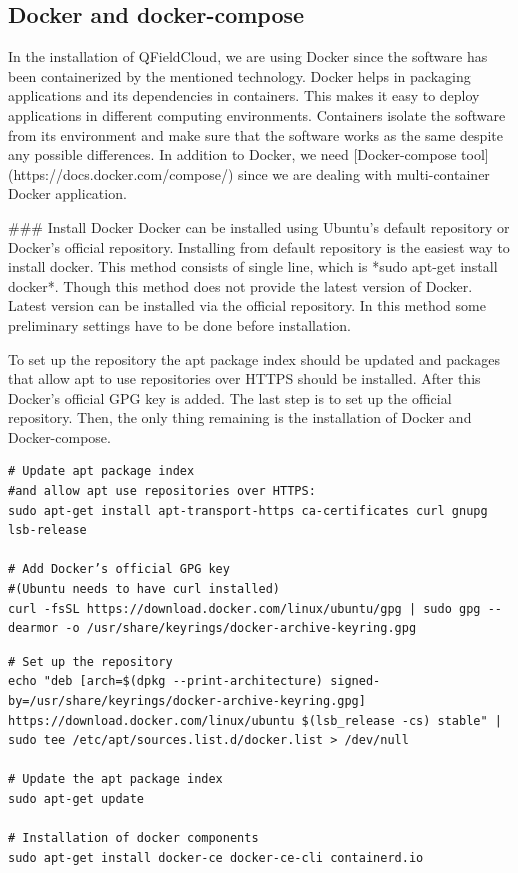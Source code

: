 \documentclass{article}
\begin{document}
\subsection{Docker and docker-compose}
\begin{markdown}
In the installation of QFieldCloud, we are using Docker since the software has been containerized by the mentioned technology. Docker helps in packaging applications and its dependencies in containers. This makes it easy to deploy applications in different computing environments. Containers isolate the software from its environment and make sure that the software works as the same despite any possible differences. In addition to Docker, we need [Docker-compose tool](https://docs.docker.com/compose/) since we are dealing with multi-container Docker application.

### Install Docker
Docker can be installed using Ubuntu’s default repository or Docker’s official repository. Installing from default repository is the easiest way to install docker. This method consists of single line, which is *sudo apt-get install docker*. Though this method does not provide the latest version of Docker. Latest version can be installed via the official repository. In this method some preliminary settings have to be done before installation. 

To set up the repository the apt package index should be updated and packages that allow apt to use repositories over HTTPS should be installed. After this Docker’s official GPG key is added. The last step is to set up the official repository. Then, the only thing remaining is the installation of Docker and Docker-compose.
\end{markdown}

\begin{verbatim}
# Update apt package index 
#and allow apt use repositories over HTTPS:
sudo apt-get install apt-transport-https ca-certificates curl gnupg lsb-release

# Add Docker’s official GPG key 
#(Ubuntu needs to have curl installed)
curl -fsSL https://download.docker.com/linux/ubuntu/gpg | sudo gpg --dearmor -o /usr/share/keyrings/docker-archive-keyring.gpg
\end{verbatim}

\begin{verbatim}
# Set up the repository
echo "deb [arch=$(dpkg --print-architecture) signed-by=/usr/share/keyrings/docker-archive-keyring.gpg] https://download.docker.com/linux/ubuntu $(lsb_release -cs) stable" | sudo tee /etc/apt/sources.list.d/docker.list > /dev/null

# Update the apt package index
sudo apt-get update

# Installation of docker components
sudo apt-get install docker-ce docker-ce-cli containerd.io
\end{verbatim}
\end{document}
